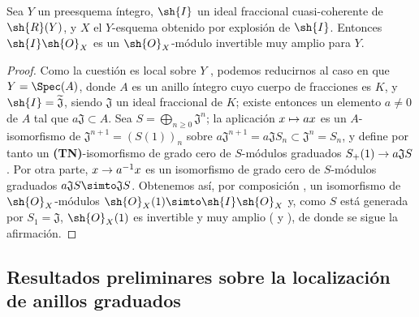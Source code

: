 \documentclass[oneside,10pt]{amsart}
\makeatletter
\renewcommand{\geq}{\geqslant}
\newcommand{\ega@arrow}[2]{\mathchoice{#1}{#2}{#2}{#2}}
\let\ega@shortmapsto\mapsto
\renewcommand{\to}{\ega@arrow{\longrightarrow}{\rightarrow}}
\renewcommand{\mapsto}{\ega@arrow{\longmapsto}{\ega@shortmapsto}}
\newcommand{\oldpage}[2][]{\marginnote{\normalfont\footnotesize\textbf{#1}~|~#2}\ignorespaces}
\let\EGAOriginalLabel\label
\renewcommand{\label}[1]{\phantomsection\EGAOriginalLabel{#1}}
\makeatother
\begin{document}
\begin{proposition}[8.1.11]
\label{II.8.1.11}
Sea $Y$ un preesquema íntegro, $\sh{I}$ un ideal fraccional cuasi-coherente de $\sh{R}(Y)$, y $X$ el $Y$-esquema obtenido por explosión de $\sh{I}$.
Entonces $\sh{I}\sh{O}_X$ es un $\sh{O}_X$-módulo invertible muy amplio para $Y$.
\end{proposition}

\begin{proof}
Como la cuestión es local sobre $Y$ , podemos reducirnos al caso en que $Y=\Spec(A)$, donde $A$ es un anillo íntegro cuyo cuerpo de fracciones es $K$, y $\sh{I}=\widetilde{\mathfrak J}$, siendo $\mathfrak J$ un ideal fraccional de $K$;
existe entonces un elemento $a\neq0$ de $A$ tal que $a\mathfrak J\subset A$.
Sea $S=\bigoplus_{n\geq0}\mathfrak J^n$;
la aplicación $x\mapsto ax$ es un $A$-isomorfismo de $\mathfrak J^{n+1}=(S(1))_n$ sobre $a\mathfrak J^{n+1}=a\mathfrak JS_n\subset\mathfrak J^n=S_n$,
\oldpage[II]{157}
y define por tanto un \textbf{(TN)}-isomorfismo de grado cero de $S$-módulos graduados $S_+(1)\to a\mathfrak JS$.
Por otra parte, $x\to a^{-1}x$ es un isomorfismo de grado cero de $S$-módulos graduados $a\mathfrak JS\simto\mathfrak JS$.
Obtenemos así, por composición , un isomorfismo de $\sh{O}_X$-módulos $\sh{O}_X(1)\simto\sh{I}\sh{O}_X$ y, como $S$ está generada por $S_1=\mathfrak J$, $\sh{O}_X(1)$ es invertible  y muy amplio ( y ), de donde se sigue la afirmación.
\end{proof}

\subsection{Resultados preliminares sobre la localización de anillos graduados}
\label{subsection:II.8.2}
\end{document}
